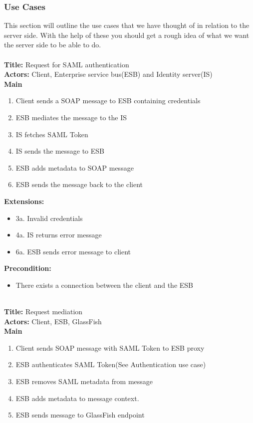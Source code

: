     \subsubsection{Use Cases}\label{Server Use Cases}
    This section will outline the use cases that we have thought of in relation to the server side. With the help of these you should get a rough idea of what we want the server side to be able to do.\\\\
    \textbf{Title:} Request for SAML authentication \\
    \textbf{Actors:} Client, Enterprise service bus(ESB) and Identity server(IS)\\
    \textbf{Main}
    \begin{enumerate}
        \item Client sends a SOAP message to ESB containing credentials
        \item ESB mediates the message to the IS
        \item IS fetches SAML Token
        \item IS sends the message to ESB
        \item ESB adds metadata to SOAP message
        \item ESB sends the message back to the client
    \end{enumerate}
    \textbf{Extensions:}
    \begin{itemize}
        \item[] 3a. Invalid credentials 
        \item[] 4a. IS returns error message
        \item[] 6a. ESB sends error message to client
    \end{itemize}
    \textbf{Precondition:}
    \begin{itemize}
        \item There exists a connection between the client and the ESB
    \end{itemize}
    ~\\
    \textbf{Title:} Request mediation\\
    \textbf{Actors:} Client, ESB, GlassFish\\
    \textbf{Main}
    \begin{enumerate}
        \item Client sends SOAP message with SAML Token to ESB proxy
        \item ESB authenticates SAML Token(See Authentication use case)
        \item ESB removes SAML metadata from message
        \item ESB adds metadata to message context.
        \item ESB sends message to GlassFish endpoint
    \end{enumerate}
